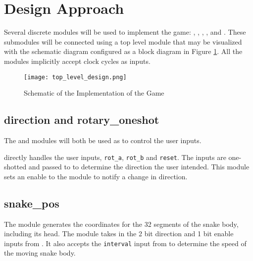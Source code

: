 \documentclass[paper=usletter, fontsize=12pt]{article}
\begin{document}



    \section{Design Approach}
    Several discrete modules will be used to implement the game: ,  , , ,  and . These submodules will be connected using a top level module that may be visualized with the schematic diagram configured as a block diagram in Figure \ref{fig:schematic}. All the modules implicitly accept clock cycles as inputs.

    \begin{figure}[ht]
        \begin{center}
            \texttt{[image: top\_level\_design.png]}
            \caption{Schematic of the Implementation of the Game} \label{fig:schematic}
        \end{center}
    \end{figure}
    \newpage

        \subsection{direction and rotary\_oneshot}
        The  and  modules will both be used as to control the user inputs.

         directly handles the user inputs, \texttt{rot\_a}, \texttt{rot\_b} and \texttt{reset}. The inputs are one-shotted and passed to  to determine the direction the user intended. This module sets an enable to the  module to notify a change in direction.

        \subsection{snake\_pos}
        The  module generates the coordinates for the 32 segments of the snake body, including its head. The module takes in the 2 bit direction and 1 bit enable inputs from . It also accepts the \texttt{interval} input from  to determine the speed of the moving snake body.
\end{document}
